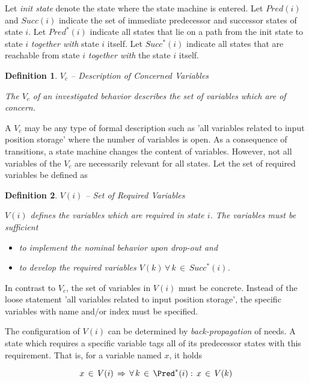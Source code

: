 \documentclass[12pt,a4paper]{scrartcl}
\newtheorem{definition}{Definition}
\begin{document}
Let \textit{init state} denote the state where the state machine is entered.
Let $Pred(i)$ and $Succ(i)$ indicate the set of immediate predecessor and
successor states of state $i$. Let $Pred^*(i)$ indicate all states that lie on
a path from the init state to state $i$ \textit{together with} state $i$
itself. Let $Succ^*(i)$ indicate all states that are reachable from state $i$
\textit{together with} the state $i$ itself.

\begin{definition}
$V_c$ -- Description of Concerned Variables

The $V_c$ of an investigated behavior describes the set of variables which
are of concern. 
\end{definition}

A $V_c$ may be any type of formal description such as 'all variables related to
input position storage' where the number of variables is open.  As a
consequence of transitions, a state machine changes the content of variables.
However, not all variables of the $V_c$ are necessarily relevant for all
states. Let the set of required variables be defined as

\begin{definition}
$V(i)$ -- Set of Required Variables

$V(i)$ defines the variables which are required in state $i$. The
variables must be sufficient
\begin{itemize}
\item to implement the nominal behavior upon drop-out and
\item to develop the required variables $V(k)\,\forall\,k\,\in\,Succ^*(i)$. 
\end{itemize}
\end{definition}

In contrast to $V_c$, the set of variables in $V(i)$ must be concrete.
Instead of the loose statement 'all variables related to input position
storage', the specific variables with name and/or index must be specified. 

The configuration of $V(i)$ can be determined by \textit{back-propagation} of
needs. A state which requires a specific variable tags all of its predecessor
states with this requirement. That is, for a variable named $x$, it holds

\begin{equation}
    x\,\in\,V(i)\,\Rightarrow\,\forall\,k\,\in\,\Pred^*(i):\,x\,\in\,V(k)
\end{equation}
\end{document}
